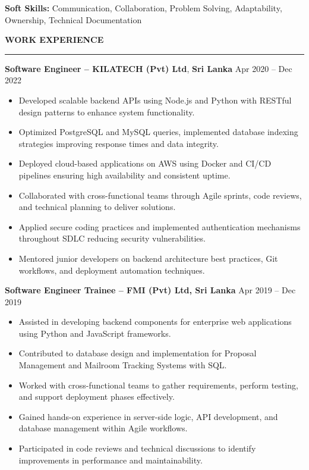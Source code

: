 \documentclass[10pt,letterpaper]{article}
\begin{document}
\textbf{Soft Skills:} Communication, Collaboration, Problem Solving, Adaptability, Ownership, Technical Documentation

\vspace{8pt}

\textbf{WORK EXPERIENCE}\\[-8pt]
\noindent\rule{\textwidth}{1pt}

\vspace{-2pt}

\textbf{Software Engineer -- KILATECH (Pvt) Ltd}, \textbf{Sri Lanka} \hfill Apr 2020 -- Dec 2022

\vspace{-1pt}

\begin{itemize}
\item Developed scalable backend APIs using Node.js and Python with RESTful design patterns to enhance system functionality.
\item Optimized PostgreSQL and MySQL queries, implemented database indexing strategies improving response times and data integrity.
\item Deployed cloud-based applications on AWS using Docker and CI/CD pipelines ensuring high availability and consistent uptime.
\item Collaborated with cross-functional teams through Agile sprints, code reviews, and technical planning to deliver solutions.
\item Applied secure coding practices and implemented authentication mechanisms throughout SDLC reducing security vulnerabilities.
\item Mentored junior developers on backend architecture best practices, Git workflows, and deployment automation techniques.
\end{itemize}

\textbf{Software Engineer Trainee -- FMI (Pvt) Ltd, Sri Lanka} \hfill Apr 2019 -- Dec 2019

\vspace{-1pt}

\begin{itemize}
\item Assisted in developing backend components for enterprise web applications using Python and JavaScript frameworks.
\item Contributed to database design and implementation for Proposal Management and Mailroom Tracking Systems with SQL.
\item Worked with cross-functional teams to gather requirements, perform testing, and support deployment phases effectively.
\item Gained hands-on experience in server-side logic, API development, and database management within Agile workflows.
\item Participated in code reviews and technical discussions to identify improvements in performance and maintainability.
\end{itemize}
\end{document}
